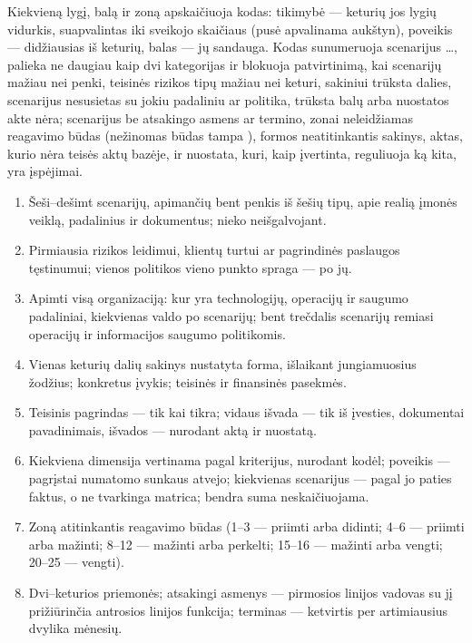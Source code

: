 Kiekvieną lygį, balą ir zoną apskaičiuoja kodas: tikimybė --- keturių jos lygių vidurkis,
suapvalintas iki sveikojo skaičiaus (pusė apvalinama aukštyn), poveikis --- didžiausias iš
keturių, balas --- jų sandauga. Kodas sunumeruoja scenarijus  …, palieka ne daugiau
kaip dvi kategorijas ir blokuoja patvirtinimą, kai scenarijų mažiau nei penki, teisinės rizikos
tipų mažiau nei keturi, sakiniui trūksta dalies, scenarijus nesusietas su jokiu padaliniu ar
politika, trūksta balų arba nuostatos akte nėra; scenarijus be atsakingo asmens ar termino,
zonai neleidžiamas reagavimo būdas (nežinomas būdas tampa ), formos
neatitinkantis sakinys, aktas, kurio nėra teisės aktų bazėje, ir nuostata, kuri, kaip įvertinta,
reguliuoja ką kita, yra įspėjimai.

\begin{enumerate}[itemsep=1pt, topsep=3pt]
  \item Šeši--dešimt scenarijų, apimančių bent penkis iš šešių tipų, apie realią įmonės veiklą,
    padalinius ir dokumentus; nieko neišgalvojant.
  \item Pirmiausia rizikos leidimui, klientų turtui ar pagrindinės paslaugos tęstinumui; vienos
    politikos vieno punkto spraga --- po jų.
  \item Apimti visą organizaciją: kur yra technologijų, operacijų ir saugumo padaliniai,
    kiekvienas valdo po scenarijų; bent trečdalis scenarijų remiasi operacijų ir
    informacijos saugumo politikomis.
  \item Vienas keturių dalių sakinys nustatyta forma, išlaikant jungiamuosius žodžius;
    konkretus įvykis; teisinės ir finansinės pasekmės.
  \item Teisinis pagrindas --- tik kai tikra; vidaus išvada --- tik iš įvesties, dokumentai
    pavadinimais, išvados --- nurodant aktą ir nuostatą.
  \item Kiekviena dimensija vertinama pagal kriterijus, nurodant kodėl; poveikis --- pagrįstai
    numatomo sunkaus atvejo; kiekvienas scenarijus --- pagal jo paties faktus, o ne tvarkinga
    matrica; bendra suma neskaičiuojama.
  \item Zoną atitinkantis reagavimo būdas (1--3 --- priimti arba didinti; 4--6 --- priimti arba
    mažinti; 8--12 --- mažinti arba perkelti; 15--16 --- mažinti arba vengti; 20--25 ---
    vengti).
  \item Dvi--keturios priemonės; atsakingi asmenys --- pirmosios linijos vadovas su jį
    prižiūrinčia antrosios linijos funkcija; terminas --- ketvirtis per artimiausius dvylika
    mėnesių.
\end{enumerate}

